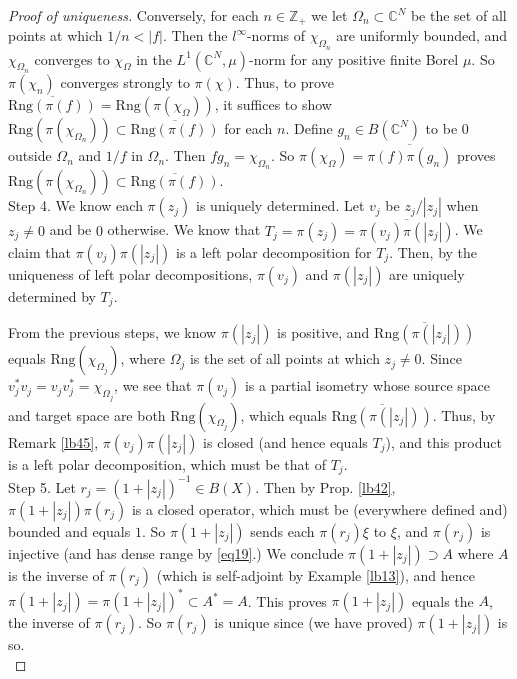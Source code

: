 \documentclass[12pt,b5paper,notitlepage]{article}
\theoremstyle{definition}
\theoremstyle{plain}
\newcommand{\ovl}{\overline}
\newcommand{\Cbb}{\mathbb C}
\newcommand{\Zbb}{\mathbb Z}
\newcommand{\Rng}{\mathrm{Rng}}
\numberwithin{equation}{section}
\begin{document}
\begin{proof}[Proof of uniqueness]
Conversely, for each $n\in\Zbb_+$ we let $\Omega_n\subset\Cbb^N$ be the set of all points at which $1/n<|f|$. Then the $l^\infty$-norms  of $\chi_{\Omega_n}$ are uniformly bounded, and $\chi_{\Omega_n}$ converges to $\chi_\Omega$ in the $L^1(\Cbb^N,\mu)$-norm for any positive finite Borel $\mu$. So $\pi(\chi_n)$ converges strongly to $\pi(\chi)$. Thus, to prove   $\ovl{\Rng(\pi(f))}=\Rng(\pi(\chi_\Omega))$, it suffices to show $\Rng(\pi(\chi_{\Omega_n}))\subset\ovl{\Rng(\pi(f))}$ for each $n$. Define $g_n\in B(\Cbb^N)$ to be $0$ outside $\Omega_n$ and $1/f$ in $\Omega_n$. Then $fg_n=\chi_{\Omega_n}$. So $\pi(\chi_{\Omega})=\ovl{\pi(f)\pi(g_n)}$ proves $\Rng(\pi(\chi_{\Omega_n}))\subset\ovl{\Rng(\pi(f))}$.\\[-1ex]
	
Step 4. We know each $\pi(z_j)$ is uniquely determined. Let $v_j$ be $z_j/|z_j|$ when $z_j\neq 0$ and be $0$ otherwise. We know that $T_j=\pi(z_j)=\ovl{\pi(v_j)\pi(|z_j|)}$. We claim that $\pi(v_j)\pi(|z_j|)$ is a left polar decomposition for $T_j$. Then, by the uniqueness of left polar decompositions, $\pi(v_j)$ and $\pi(|z_j|)$ are uniquely determined by $T_j$. 

From the previous steps, we know $\pi(|z_j|)$ is positive, and $\ovl{\Rng(\pi(|z_j|))}$ equals $\Rng(\chi_{\Omega_j})$, where $\Omega_j$ is the set of all points at which $z_j\neq 0$. Since $v_j^*v_j=v_jv_j^*=\chi_{\Omega_j}$, we see that $\pi(v_j)$ is a partial isometry whose source space and target space are both $\Rng(\chi_{\Omega_j})$, which equals $\ovl{\Rng(\pi(|z_j|))}$. Thus, by Remark \ref{lb45}, $\pi(v_j)\pi(|z_j|)$ is closed (and hence equals $T_j$), and this product is a left polar decomposition, which must be that of $T_j$.\\[-1ex]

Step 5. Let $r_j=(1+|z_j|)^{-1}\in B(X)$. Then by Prop. \ref{lb42},  $\pi(1+|z_j|)\pi(r_j)$ is a closed operator, which must be (everywhere defined and) bounded and equals $1$. So $\pi(1+|z_j|)$ sends each $\pi(r_j)\xi$ to $\xi$, and $\pi(r_j)$ is injective (and has dense range by \eqref{eq19}.) We conclude $\pi(1+|z_j|)\supset A$ where $A$ is the inverse of $\pi(r_j)$ (which is self-adjoint by Example \ref{lb13}), and hence $\pi(1+|z_j|)=\pi(1+|z_j|)^*\subset A^*=A$. This proves $\pi(1+|z_j|)$ equals the $A$, the inverse  of $\pi(r_j)$. So $\pi(r_j)$ is unique since (we have proved) $\pi(1+|z_j|)$ is so.\\[-1ex]




\end{proof}
\end{document}
